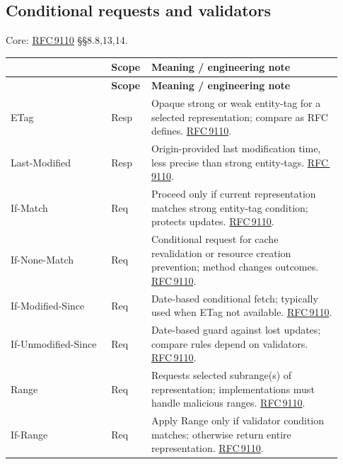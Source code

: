 \documentclass[10pt,letterpaper,oneside]{article}
\newcommand{\rf}[1]{\href{https://www.rfc-editor.org/rfc/rfc#1.html}{RFC\,#1}}
\newcommand{\cataloghead}{\toprule\rowcolor{Navy}\multicolumn{1}{>{\columncolor{Navy}}p{0.291\linewidth}}{\color{white}\sffamily\bfseries Field} & \color{white}\sffamily\bfseries Scope & \color{white}\sffamily\bfseries Meaning / engineering note \\ \midrule}
\newcommand{\catalogstart}{\begingroup\footnotesize\setlength{\LTpre}{0.15em}\setlength{\LTpost}{0.6em}\begin{longtable}{>{\RaggedRight\arraybackslash}p{0.291\linewidth}>{\RaggedRight\arraybackslash}p{0.085\linewidth}>{\RaggedRight\arraybackslash}p{0.555\linewidth}}\cataloghead\endfirsthead\cataloghead\endhead}
\newcommand{\catalogend}{\bottomrule\end{longtable}\endgroup}
\begin{document}
\subsection{Conditional requests and validators}
\begin{tipbox}\footnotesize Core: \rf{9110} §§8.8,13,14.\end{tipbox}
\catalogstart
{\ttfamily\color{Deep}ETag} & {\sffamily\scriptsize\color{Muted}Resp} & Opaque strong or weak entity-tag for a selected representation; compare as RFC defines. \rf{9110}. \\ \midrule
{\ttfamily\color{Deep}Last-\allowbreak{}Modified} & {\sffamily\scriptsize\color{Muted}Resp} & Origin-provided last modification time, less precise than strong entity-tags. \rf{9110}. \\ \midrule
{\ttfamily\color{Deep}If-\allowbreak{}Match} & {\sffamily\scriptsize\color{Muted}Req} & Proceed only if current representation matches strong entity-tag condition; protects updates. \rf{9110}. \\ \midrule
{\ttfamily\color{Deep}If-\allowbreak{}None-\allowbreak{}Match} & {\sffamily\scriptsize\color{Muted}Req} & Conditional request for cache revalidation or resource creation prevention; method changes outcomes. \rf{9110}. \\ \midrule
{\ttfamily\color{Deep}If-\allowbreak{}Modified-\allowbreak{}Since} & {\sffamily\scriptsize\color{Muted}Req} & Date-based conditional fetch; typically used when ETag not available. \rf{9110}. \\ \midrule
{\ttfamily\color{Deep}If-\allowbreak{}Unmodified-\allowbreak{}Since} & {\sffamily\scriptsize\color{Muted}Req} & Date-based guard against lost updates; compare rules depend on validators. \rf{9110}. \\ \midrule
{\ttfamily\color{Deep}Range} & {\sffamily\scriptsize\color{Muted}Req} & Requests selected subrange(s) of representation; implementations must handle malicious ranges. \rf{9110}. \\ \midrule
{\ttfamily\color{Deep}If-\allowbreak{}Range} & {\sffamily\scriptsize\color{Muted}Req} & Apply Range only if validator condition matches; otherwise return entire representation. \rf{9110}. \\ \midrule
\catalogend
\end{document}
